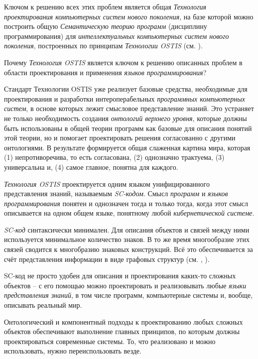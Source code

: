 Ключом к решению всех этих проблем является общая \textit{Технология проектирования компьютерных систем нового поколения}, на базе которой можно построить общую \textit{Семантическую теорию программ} (дисциплину программирования) для \textit{интеллектуальных компьютерных систем нового поколения}, построенных по принципам \textit{Технологии OSTIS} (см. ).

Почему \textit{Технология OSTIS} является ключом к решению описанных проблем в области проектирования и применения \textit{языков программирования}?
\begin{textitemize}
    \item Стандарт Технологии OSTIS  уже реализует базовые средства, необходимые для проектирования и разработки интероперабельных \textit{программных компьютерных систем}, в основе которых лежит смысловое представление знаний. Это устраняет не только необходимость создания \textit{онтологий верхнего уровня}, которые должны быть использованы в общей теории программ как базовые для описания понятий этой теории, но и помогает проектировать решения согласованно с другими онтологиями. В результате формируется общая слаженная картина мира, которая (1) непротиворечива, то есть согласована, (2) однозначно трактуема, (3) универсальна и, (4) самое главное, понятна для каждого.
    \item \textit{Технология OSTIS} проектируется одним языком унифицированного представления знаний, называемым \textit{SC-кодом}. Смысл \textit{программ} и \textit{языков программирования} понятен и однозначен тогда и только тогда, когда этот смысл описывается на одном общем языке, понятному любой \textit{кибернетической системе}.
    \item \textit{SC-код} синтаксически минимален. Для описания объектов и связей между ними используется минимальное количество знаков. В то же время многообразие этих связей сводится к многобразию знаковых конструкций. Всё это обеспечивается за счёт представления информации в виде графовых структур (см. , ).
    \item SC-код не просто удобен для описания и проектирования каких-то сложных объектов -- с его помощью можно проектировать и реализовывать любые \textit{языки представления знаний}, в том числе программ, компьютерные системы и, вообще, описывать реальный мир.
    \item Онтологический и компонентный подходы к проектированию любых сложных объектов обеспечивают выполнение главных принципов, по которым должны проектироваться современные системы. То, что реализовано и можно использовать, нужно переиспользовать везде.
\end{textitemize}

